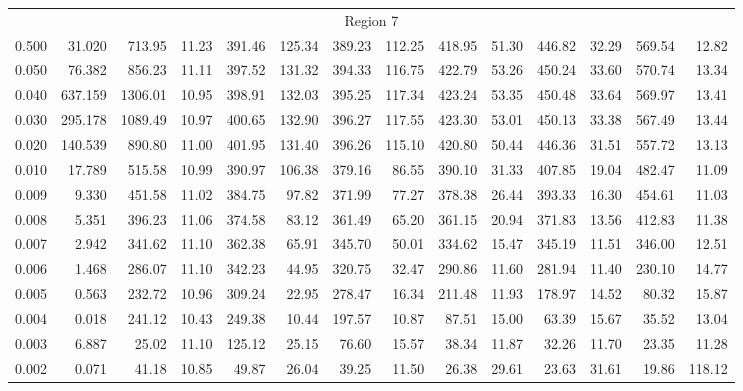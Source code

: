 \begin{tabular}{@{}lrrrrrrrrrrrrr@{}}
\midrule
\multicolumn{14}{c}{Region 7} \\
\cmidrule{1-14}
0.500 & 31.020 & 713.95 & 11.23 & 391.46 & 125.34 & 389.23 & 112.25 & 418.95 & 51.30 & 446.82 & 32.29 & 569.54 & 12.82 \\
0.050 & 76.382 & 856.23 & 11.11 & 397.52 & 131.32 & 394.33 & 116.75 & 422.79 & 53.26 & 450.24 & 33.60 & 570.74 & 13.34 \\
0.040 & 637.159 & 1306.01 & 10.95 & 398.91 & 132.03 & 395.25 & 117.34 & 423.24 & 53.35 & 450.48 & 33.64 & 569.97 & 13.41 \\
0.030 & 295.178 & 1089.49 & 10.97 & 400.65 & 132.90 & 396.27 & 117.55 & 423.30 & 53.01 & 450.13 & 33.38 & 567.49 & 13.44 \\
0.020 & 140.539 & 890.80 & 11.00 & 401.95 & 131.40 & 396.26 & 115.10 & 420.80 & 50.44 & 446.36 & 31.51 & 557.72 & 13.13 \\
0.010 & 17.789 & 515.58 & 10.99 & 390.97 & 106.38 & 379.16 & 86.55 & 390.10 & 31.33 & 407.85 & 19.04 & 482.47 & 11.09 \\
0.009 & 9.330 & 451.58 & 11.02 & 384.75 & 97.82 & 371.99 & 77.27 & 378.38 & 26.44 & 393.33 & 16.30 & 454.61 & 11.03 \\
0.008 & 5.351 & 396.23 & 11.06 & 374.58 & 83.12 & 361.49 & 65.20 & 361.15 & 20.94 & 371.83 & 13.56 & 412.83 & 11.38 \\
0.007 & 2.942 & 341.62 & 11.10 & 362.38 & 65.91 & 345.70 & 50.01 & 334.62 & 15.47 & 345.19 & 11.51 & 346.00 & 12.51 \\
0.006 & 1.468 & 286.07 & 11.10 & 342.23 & 44.95 & 320.75 & 32.47 & 290.86 & 11.60 & 281.94 & 11.40 & 230.10 & 14.77 \\
0.005 & 0.563 & 232.72 & 10.96 & 309.24 & 22.95 & 278.47 & 16.34 & 211.48 & 11.93 & 178.97 & 14.52 & 80.32 & 15.87 \\
0.004 & 0.018 & 241.12 & 10.43 & 249.38 & 10.44 & 197.57 & 10.87 & 87.51 & 15.00 & 63.39 & 15.67 & 35.52 & 13.04 \\
0.003 & 6.887 & 25.02 & 11.10 & 125.12 & 25.15 & 76.60 & 15.57 & 38.34 & 11.87 & 32.26 & 11.70 & 23.35 & 11.28 \\
0.002 & 0.071 & 41.18 & 10.85 & 49.87 & 26.04 & 39.25 & 11.50 & 26.38 & 29.61 & 23.63 & 31.61 & 19.86 & 118.12 \\

\bottomrule
\end{tabular}

